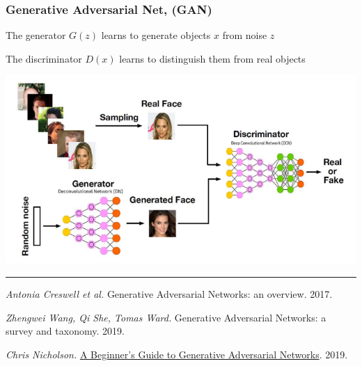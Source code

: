 \documentclass[fullscreen=true, bookmarks=true, hyperref={pdfencoding=unicode}]{beamer}
\begin{document}
\begin{frame}
  \frametitle{Generative Adversarial Net, (GAN)}

  The generator $G(z)$ learns to generate objects $x$ from noise $z$

  The discriminator $D(x)$ learns to distinguish them from real objects

  \begin{center}
    \includegraphics[keepaspectratio,
                     width=.65\paperwidth]{GAN_scheme.png}
  \end{center}

  \noindent\rule{8cm}{0.4pt}

  {\tiny
  {\it Antonia Creswell et al.} Generative Adversarial Networks: an overview. 2017.

  {\it Zhengwei Wang, Qi She, Tomas Ward.} Generative Adversarial Networks: a survey and taxonomy. 2019.

  {\it Chris Nicholson.} \href{https://pathmind.com/wiki/generative-adversarial-network-gan}{A Beginner's Guide to Generative Adversarial Networks}. 2019.
  }
\end{frame}
\end{document}
